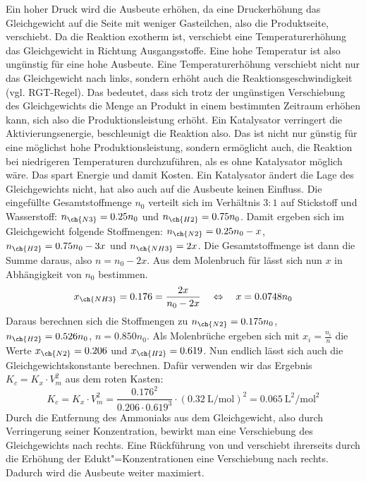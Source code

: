 \documentclass[DIV11]{scrartcl}
\begin{document}
\begin{solution}
  \begin{tasks}
    \task Ein hoher Druck wird die Ausbeute erhöhen, da eine Druckerhöhung das
      Gleichgewicht auf die Seite mit weniger Gasteilchen, also die
      Produktseite, verschiebt.  Da die Reaktion exotherm ist, verschiebt eine
      Temperaturerhöhung das Gleichgewicht in Richtung Ausgangsstoffe.  Eine
      hohe Temperatur ist also ungünstig für eine hohe Ausbeute.
    \task Eine Temperaturerhöhung verschiebt nicht nur das Gleichgewicht nach
      links, sondern erhöht auch die Reaktionsgeschwindigkeit
      (vgl. RGT-Regel).  Das bedeutet, dass sich trotz der ungünstigen
      Verschiebung des Gleichgewichts die Menge an Produkt in einem bestimmten
      Zeitraum erhöhen kann, sich also die Produktionsleistung erhöht.
    \task Ein Katalysator verringert die Aktivierungsenergie, beschleunigt die
      Reaktion also.  Das ist nicht nur günstig für eine möglichst hohe
      Produktionsleistung, sondern ermöglicht auch, die Reaktion bei
      niedrigeren Temperaturen durchzuführen, als es ohne Katalysator möglich
      wäre.  Das spart Energie und damit Kosten.  Ein Katalysator ändert die
      Lage des Gleichgewichts nicht, hat also auch auf die Ausbeute keinen
      Einfluss.
    \task Die eingefüllte Gesamtstoffmenge $n_0$ verteilt sich im Verhältnis
      $3:1$ auf Stickstoff und Wasserstoff: $n_{\ch{N3}} = 0.25n_0$ und
      $n_{\ch{H2}} = 0.75n_0$.  Damit ergeben sich im Gleichgewicht folgende
      Stoffmengen: $n_{\ch{N2}} = 0.25n_0 - x$, $n_{\ch{H2}} = 0.75n_0 - 3x$ und
      $n_{\ch{NH3}} = 2x$. Die Gesamtstoffmenge ist dann die Summe daraus,
      also $n=n_0-2x$.  Aus dem Molenbruch für  lässt sich nun $x$ in
      Abhängigkeit von $n_0$ bestimmen.
      \[
        x_{\ch{NH3}} = 0.176 = \frac{2x}{n_0-2x}
        \quad \Leftrightarrow \quad
        x = 0.0748n_0
      \]
      Daraus berechnen sich die Stoffmengen zu $n_{\ch{N2}} = 0.175n_0$,
      $n_{\ch{H2}} = 0.526n_0$, $n = 0.850n_0$.  Als Molenbrüche ergeben sich
      mit $x_i=\frac{n_i}{n}$ die Werte $x_{\ch{N2}} = 0.206$ und $x_{\ch{H2}}
      = 0.619$.  Nun endlich lässt sich auch die Gleichgewichtskonstante
      berechnen.  Dafür verwenden wir das Ergebnis $K_c=K_x\cdot V_m^2$ aus
      dem roten Kasten:
      \[
        K_c = K_x\cdot V_m^2
            = \frac{0.176^2}{0.206\cdot0.619^3}\cdot
              (\SI{0.32}{\liter\per\mole})^2
            = \SI{0.065}{\liter\squared\per\mole\squared}
      \]
    \task Durch die Entfernung des Ammoniaks aus dem Gleichgewicht, also durch
      Verringerung seiner Konzentration, bewirkt man eine Verschiebung des
      Gleichgewichts nach rechts.  Eine Rückführung von  und 
      verschiebt ihrerseits durch die Erhöhung der Edukt"=Konzentrationen
      eine Verschiebung nach rechts.  Dadurch wird die Ausbeute weiter maximiert.
  \end{tasks}
\end{solution}
\end{document}
